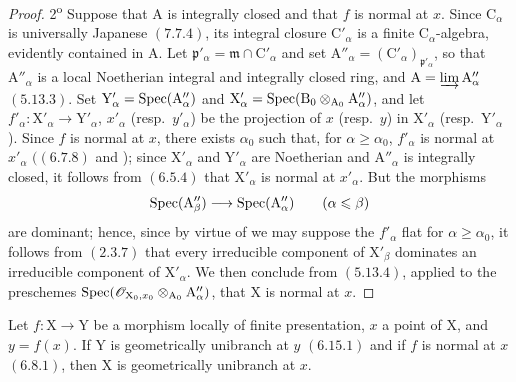 \begin{proof}
2\textsuperscript{o} Suppose that $\mathrm{A}$ is integrally closed and that $f$ is normal at $x$. Since $\mathrm{C}_\alpha$ is universally Japanese $(7.7.4)$, its integral closure $\mathrm{C}'_\alpha$ is a finite $\mathrm{C}_\alpha$-algebra, evidently contained in $\mathrm{A}$. Let $\mathfrak{p}'_\alpha=\mathfrak{m}\cap\mathrm{C}'_\alpha$ and set $\mathrm{A}''_\alpha=(\mathrm{C}'_\alpha)_{\mathfrak{p}'_\alpha}$, so that $\mathrm{A}''_\alpha$ is a local Noetherian integral and integrally closed ring, and $\mathrm{A}=\varinjlim\mathrm{A}''_\alpha$ $(5.13.3)$. Set $\mathrm{Y}'_\alpha=\operatorname{Spec}(\mathrm{A}''_\alpha)$ and $\mathrm{X}'_\alpha=\operatorname{Spec}(\mathrm{B}_0\otimes_{\mathrm{A}_0}\mathrm{A}''_\alpha)$, and let $f'_\alpha:\mathrm{X}'_\alpha\to\mathrm{Y}'_\alpha$, $x'_\alpha$ (resp.\ $y'_\alpha$) be the projection of $x$ (resp.\ $y$) in $\mathrm{X}'_\alpha$ (resp.\ $\mathrm{Y}'_\alpha$). Since $f$ is normal at $x$, there exists $\alpha_0$ such that, for $\alpha\geqslant\alpha_0$, $f'_\alpha$ is normal at $x'_\alpha$ $((6.7.8)$ and );  since $\mathrm{X}'_\alpha$ and $\mathrm{Y}'_\alpha$ are Noetherian and $\mathrm{A}''_\alpha$ is integrally closed, it follows from $(6.5.4)$ that $\mathrm{X}'_\alpha$ is normal at $x'_\alpha$. But the morphisms
\[
  \operatorname{Spec}(\mathrm{A}''_\beta)\longrightarrow\operatorname{Spec}(\mathrm{A}''_\alpha)
  \qquad(\alpha\leqslant\beta)
\]
are dominant; hence, since by virtue of  we may suppose the $f'_\alpha$ flat for $\alpha\geqslant\alpha_0$, it follows from $(2.3.7)$ that every irreducible component of $\mathrm{X}'_\beta$ dominates an irreducible component of $\mathrm{X}'_\alpha$. We then conclude from $(5.13.4)$, applied to the preschemes $\operatorname{Spec}\!\left(\mathscr{O}_{\mathrm{X}_0,x_0}\otimes_{\mathrm{A}_0}\mathrm{A}''_\alpha\right)$,
that $\mathrm{X}$ is normal at $x$.
\end{proof}

\begin{corollary}[11.3.14]
\label{IV.11.3.14}
Let $f:\mathrm{X}\to\mathrm{Y}$ be a morphism locally of finite presentation, $x$ a point of $\mathrm{X}$, and $y=f(x)$. If $\mathrm{Y}$ is geometrically unibranch at $y$ $(6.15.1)$ and if $f$ is normal at $x$ $(6.8.1)$, then $\mathrm{X}$ is geometrically unibranch at $x$.
\end{corollary}

